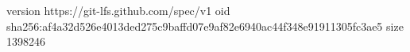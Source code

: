 version https://git-lfs.github.com/spec/v1
oid sha256:af4a32d526e4013ded275c9baffd07e9af82e6940ac44f348e91911305fc3ae5
size 1398246
